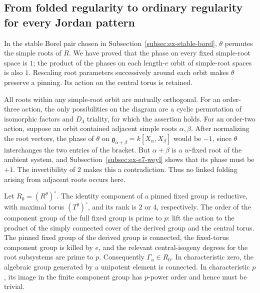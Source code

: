 \documentclass[11pt,a4paper]{article}
\theoremstyle{definition}
\theoremstyle{remark}
\begin{document}
\subsection{From folded regularity to ordinary regularity for every Jordan pattern}
\label{subsec:ex-folding}

In the stable Borel pair chosen in
Subsection~\ref{subsec:ex-stable-borel}, \(\theta\) permutes the simple roots
of \(R\). We have proved that the phase on every fixed simple-root space
is \(1\); the product of the phases on each length-\(e\) orbit of
simple-root spaces is also \(1\).
Rescaling root parameters successively around each orbit makes \(\theta\)
preserve a pinning. Its action on the central torus is retained.

All roots within any simple-root orbit are mutually orthogonal.
For an order-three action, the only possibilities on the diagram are a
cyclic permutation of isomorphic factors and \(D_4\) triality, for which
the assertion holds.
For an order-two action, suppose an orbit contained adjacent simple roots
\(\alpha,\beta\). After normalizing the root vectors, the phase of
\(\theta\) on
\(\mathfrak g_{\alpha+\beta}=k[X_\alpha,X_\beta]\)
would be \(-1\), since \(\theta\) interchanges the two entries of the
bracket. But \(\alpha+\beta\) is a \(w\)-fixed root of the ambient system,
and Subsection~\ref{subsec:ex-e7-weyl} shows that its phase must be \(+1\).
The invertibility of \(2\) makes this a contradiction.
Thus no linked folding arising from adjacent roots occurs here.

Let \(R_0=(R^\theta)^\circ\).
The identity component of a pinned fixed group is reductive, with maximal
torus \((T^\theta)^\circ\), and its rank is \(2\) or \(4\), respectively.
The order of the component group of the full fixed group is prime to
\(p\): lift the action to the product of the simply connected cover of
the derived group and the central torus. The pinned fixed group of the
derived group is connected, the fixed-torus component group is killed by
\(e\), and the relevant central-isogeny degrees for the root subsystems
are prime to \(p\).
Consequently \(\Gamma_u\in R_0\).
In characteristic zero, the algebraic group generated by a unipotent
element is connected. In characteristic \(p\), its image in the finite
component group has \(p\)-power order and hence must be trivial.
\end{document}
